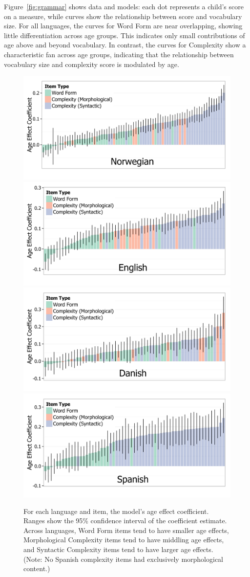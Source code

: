 \documentclass[10pt,letterpaper]{article}
\begin{document}
Figure~\ref{fig:grammar} shows data and models: each dot represents a child's score on a measure, while curves show the relationship between score and vocabulary size.
For all languages, the curves for Word Form are near overlapping, showing little differentiation across age groups. This indicates only small contributions of age above and beyond vocabulary. In contrast, the curves for Complexity show a characteristic fan across age groups, indicating that the relationship between vocabulary size and complexity score is modulated by age. %

\begin{figure}
\centering
\includegraphics[width=.45\textwidth]{plots/norwegian_interactions}
\includegraphics[width=.45\textwidth]{plots/english_interactions}\\
\includegraphics[width=.45\textwidth]{plots/danish_interactions}
\includegraphics[width=.45\textwidth]{plots/spanish_interactions} 
\caption{\label{fig:interactions} For each language and item, the model's age effect coefficient. Ranges show the 95\% confidence interval of the coefficient estimate. Across languages, Word Form items tend to have smaller age effects, Morphological Complexity items tend to have middling age effects, and Syntactic Complexity items tend to have larger age effects. (Note: No Spanish complexity items had exclusively morphological content.)}
\end{figure}
\end{document}
